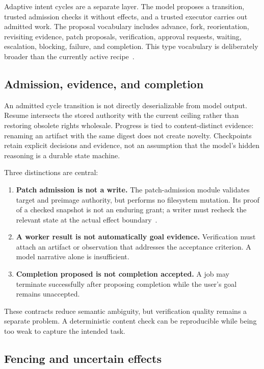 Adaptive intent cycles are a separate layer. The model proposes a transition, trusted admission checks it without effects, and a trusted executor carries out admitted work. The proposal vocabulary includes advance, fork, reorientation, revisiting evidence, patch proposals, verification, approval requests, waiting, escalation, blocking, failure, and completion. This type vocabulary is deliberately broader than the currently active recipe~\cite{ref6}.

\subsection{Admission, evidence, and completion}

An admitted cycle transition is not directly deserializable from model output. Resume intersects the stored authority with the current ceiling rather than restoring obsolete rights wholesale. Progress is tied to content-distinct evidence: renaming an artifact with the same digest does not create novelty. Checkpoints retain explicit decisions and evidence, not an assumption that the model's hidden reasoning is a durable state machine.

Three distinctions are central:
\begin{enumerate}
  \item \textbf{Patch admission is not a write.} The patch-admission module validates target and preimage authority, but performs no filesystem mutation. Its proof of a checked snapshot is not an enduring grant; a writer must recheck the relevant state at the actual effect boundary~\cite{ref22}.
  \item \textbf{A worker result is not automatically goal evidence.} Verification must attach an artifact or observation that addresses the acceptance criterion. A model narrative alone is insufficient.
  \item \textbf{Completion proposed is not completion accepted.} A job may terminate successfully after proposing completion while the user's goal remains unaccepted.
\end{enumerate}

These contracts reduce semantic ambiguity, but verification quality remains a separate problem. A deterministic content check can be reproducible while being too weak to capture the intended task.

\subsection{Fencing and uncertain effects}

